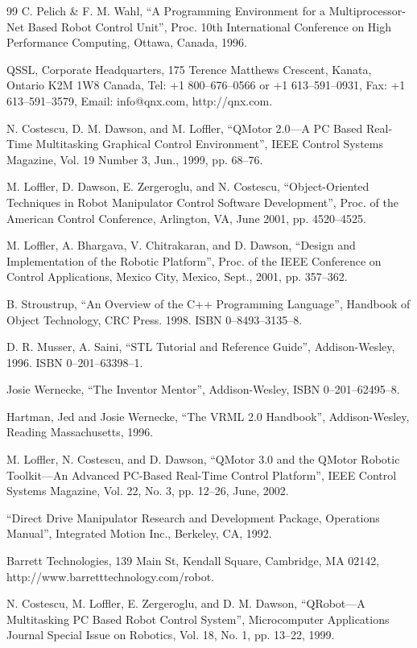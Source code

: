 \documentclass[UTF8,a4paper,12pt]{ctexart}
\begin{document}
\begin{thebibliography}{99}
 C. Pelich \& F. M. Wahl, ``A Programming Environment for a Multiprocessor-Net Based Robot Control Unit'', Proc. 10th International Conference on High Performance Computing, Ottawa, Canada, 1996.

 QSSL, Corporate Headquarters, 175 Terence Matthews Crescent, Kanata, Ontario K2M 1W8 Canada, Tel: +1 800--676--0566 or +1 613--591--0931, Fax: +1 613--591--3579, Email: info@qnx.com, http://qnx.com.

 N. Costescu, D. M. Dawson, and M. Loffler, ``QMotor 2.0---A PC Based Real-Time Multitasking Graphical Control Environment'', IEEE Control Systems Magazine, Vol. 19 Number 3, Jun., 1999, pp. 68--76.

 M. Loffler, D. Dawson, E. Zergeroglu, and N. Costescu, ``Object-Oriented Techniques in Robot Manipulator Control Software Development'', Proc. of the American Control Conference, Arlington, VA, June 2001, pp. 4520--4525.

 M. Loffler, A. Bhargava, V. Chitrakaran, and D. Dawson, ``Design and Implementation of the Robotic Platform'', Proc. of the IEEE Conference on Control Applications, Mexico City, Mexico, Sept., 2001, pp. 357--362.

 B. Stroustrup, ``An Overview of the C++ Programming Language'', Handbook of Object Technology, CRC Press. 1998. ISBN 0--8493--3135--8.

 D. R. Musser, A. Saini, ``STL Tutorial and Reference Guide'', Addison-Wesley, 1996. ISBN 0--201--63398--1.

 Josie Wernecke, ``The Inventor Mentor'', Addison-Wesley, ISBN 0--201--62495--8.

 Hartman, Jed and Josie Wernecke, ``The VRML 2.0 Handbook'', Addison-Wesley, Reading Massachusetts, 1996.

 M. Loffler, N. Costescu, and D. Dawson, ``QMotor 3.0 and the QMotor Robotic Toolkit---An Advanced PC-Based Real-Time Control Platform'', IEEE Control Systems Magazine, Vol. 22, No. 3, pp. 12--26, June, 2002.

 ``Direct Drive Manipulator Research and Development Package, Operations Manual'', Integrated Motion Inc., Berkeley, CA, 1992.

 Barrett Technologies, 139 Main St, Kendall Square, Cambridge, MA 02142, http://www.barretttechnology.com/robot.

 N. Costescu, M. Loffler, E. Zergeroglu, and D. M. Dawson, ``QRobot---A Multitasking PC Based Robot Control System'', Microcomputer Applications Journal Special Issue on Robotics, Vol. 18, No. 1, pp. 13--22, 1999.

\end{thebibliography}
\end{document}
